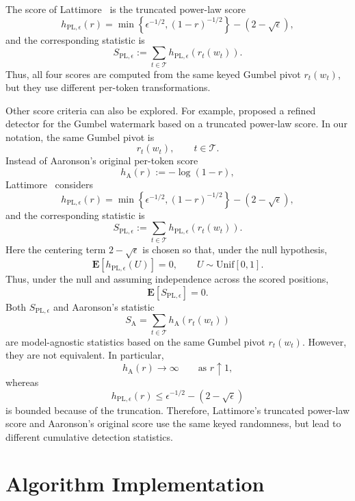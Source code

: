 \documentclass{article}
\theoremstyle{plain}
\theoremstyle{definition}
\begin{document}
The score of Lattimore~\citep{lattimore2026refined} is the truncated power-law score
\[
h_{\mathrm{PL},\epsilon}(r)
=
\min\left\{
\epsilon^{-1/2},
(1-r)^{-1/2}
\right\}
-(2-\sqrt{\epsilon}),
\]
and the corresponding statistic is
\[
S_{\mathrm{PL},\epsilon}
:=
\sum_{t\in\mathcal{T}}
h_{\mathrm{PL},\epsilon}(r_t(w_t)).
\]
Thus, all four scores are computed from the same keyed Gumbel pivot
$r_t(w_t)$, but they use different per-token transformations.




Other score criteria can also be explored. For example, \citet{lattimore2026refined}
proposed a refined detector for the Gumbel watermark based on a truncated power-law score.
In our notation, the same Gumbel pivot is
\[
r_t(w_t),
\qquad t\in\mathcal{T}.
\]
Instead of Aaronson's original per-token score
\[
h_{\mathrm{A}}(r):=-\log(1-r),
\]
Lattimore~\citep{lattimore2026refined} considers
\[
h_{\mathrm{PL},\epsilon}(r)
=
\min\left\{
\epsilon^{-1/2},
(1-r)^{-1/2}
\right\}
-(2-\sqrt{\epsilon}),
\]
and the corresponding statistic is
\[
S_{\mathrm{PL},\epsilon}
:=
\sum_{t\in\mathcal{T}}
h_{\mathrm{PL},\epsilon}(r_t(w_t)).
\]
Here the centering term $2-\sqrt{\epsilon}$ is chosen so that, under the null hypothesis,
\[
\mathbf{E}\!\left[h_{\mathrm{PL},\epsilon}(U)\right]=0,
\qquad U\sim\mathrm{Unif}[0,1].
\]
Thus, under the null and assuming independence across the scored positions,
\[
\mathbf{E}[S_{\mathrm{PL},\epsilon}]=0.
\]
Both $S_{\mathrm{PL},\epsilon}$ and Aaronson's statistic
\[
S_{\mathrm{A}}
=
\sum_{t\in\mathcal{T}}h_{\mathrm{A}}(r_t(w_t))
\]
are model-agnostic statistics based on the same Gumbel pivot $r_t(w_t)$.
However, they are not equivalent. In particular,
\[
h_{\mathrm{A}}(r)\to\infty
\qquad\text{as }r\uparrow 1,
\]
whereas
\[
h_{\mathrm{PL},\epsilon}(r)
\leq
\epsilon^{-1/2}-(2-\sqrt{\epsilon})
\]
is bounded because of the truncation. Therefore, Lattimore's truncated power-law score and Aaronson's original score use the same keyed randomness, but lead to different cumulative detection statistics. 



\section{Algorithm Implementation}
\label{app::alg_imple}
\end{document}

